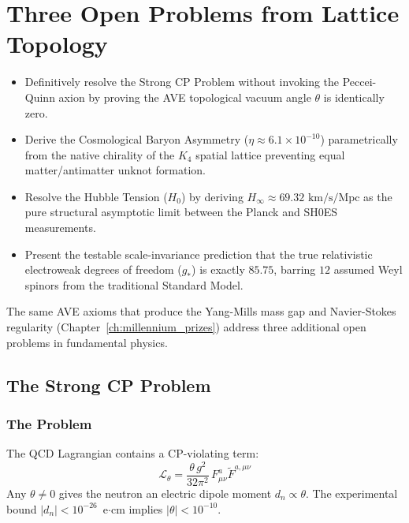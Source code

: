
\chapter{Three Open Problems from Lattice Topology}
\label{ch:open_problems}

\begin{objectivebox}
\begin{itemize}
    \item Definitively resolve the Strong CP Problem without invoking the Peccei-Quinn axion by proving the AVE topological vacuum angle $\theta$ is identically zero.
    \item Derive the Cosmological Baryon Asymmetry ($\eta \approx 6.1 \times 10^{-10}$) parametrically from the native chirality of the $K_4$ spatial lattice preventing equal matter/antimatter unknot formation.
    \item Resolve the Hubble Tension ($H_0$) by deriving $H_\infty \approx 69.32\text{ km/s/Mpc}$ as the pure structural asymptotic limit between the Planck and SH0ES measurements.
    \item Present the testable scale-invariance prediction that the true relativistic electroweak degrees of freedom ($g_*$) is exactly $85.75$, barring $12$ assumed Weyl spinors from the traditional Standard Model.
\end{itemize}
\end{objectivebox}

The same AVE axioms that produce the Yang-Mills mass gap
and Navier-Stokes regularity (Chapter~\ref{ch:millennium_prizes}) address three additional open
problems in fundamental physics.

\section{The Strong CP Problem}
\label{sec:strong_cp}

\subsection{The Problem}

The QCD Lagrangian contains a CP-violating term:
\begin{equation}
    \mathcal{L}_\theta = \frac{\theta\, g^2}{32\pi^2}\,
    F^a_{\mu\nu} \tilde{F}^{a,\mu\nu}
    \label{eq:theta_term}
\end{equation}
Any $\theta \ne 0$ gives the neutron an electric dipole moment
$d_n \propto \theta$.  The experimental bound
$|d_n| < 10^{-26}$~e$\cdot$cm implies $|\theta| < 10^{-10}$.

